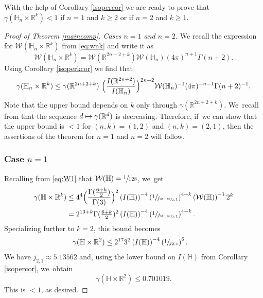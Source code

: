 \documentclass[11pt]{article}
\newcommand{\skpt}{\smallskip}
\newcommand\mto{\mathchoice{\longmapsto}{\mapsto}{\mapsto}{\mapsto}}
\let\oldsfrac\sfrac
\renewcommand{\sfrac}[2]{{\oldsfrac{#1}{#2}}}
\newcommand{\psfrac}[2]{{\sfrac{(#1)}{#2}}}
\theoremstyle{definition}
\newcommand{\1}{\mathbbm{1}}
\newcommand{\R}{\mathbb{R}}
\numberwithin{equation}{section}
\begin{document}
With the help of Corollary \ref{isopercor} we are ready to prove that $\gamma(\mathbb H_n\times\R^k)<1$ if $n=1$ and $k\geq 2$ or if $n=2$ and $k\geq 1$.

\skpt
\begin{proof}[Proof of Theorem \ref{maincomp}. Cases $n\!=\!1$ and $n\!=\!2$]
We recall the expression for $\mathcal W(\mathbb H_n\times\R^k)$ from \eqref{eq:wnk} and write it as
\[
\mathcal W(\mathbb H_n\times\R^k) = \mathcal W(\R^{2n+2+k}) \mathcal W(\mathbb H_n) (4\pi)^{n+1} \Gamma(n+2).
\]
Using Corollary \ref{isoperkcor} we find that
\begin{equation}
\label{eq:gammankbound}
\gamma(\mathbb H_n\times\R^k) \leq \gamma(\R^{2n+2+k})\ \Bigl(\frac{I(\R^{2n+2})}{I(\mathbb H_n)}\Bigr)^{2n+2} \mathcal W(\mathbb H_n)^{-1} (4\pi)^{-n-1} \Gamma(n+2)^{-1}.
\end{equation}
Note that the upper bound depends on $k$ only through $\gamma(\R^{2n+2+k})$. We~recall from \cite[Th.\,5.1]{HPS} that the sequence $d\mto \gamma(\R^d)$ is decreasing. Therefore, if~we can show that the upper bound is $<1$ for $(n,k)=(1,2)$ and $(n,k)=(2,1)$, then the assertions of the theorem for $n=1$ and $n=2$ will follow.

\subsubsection*{Case $n=1$} Recalling from \eqref{eq:W1} that $\mathcal W(\mathbb H) = \sfrac1{128}$, we~get
\begin{align}\label{eq:gammankboundn1}
\gamma(\mathbb H\times\R^k)
& \leq 4^4 \Bigl(\frac{\Gamma(\frac{6+k}{2})}{\Gamma(3)}\Bigr)^2
\left(I(\mathbb H)\right)^{-4} \left(\sfrac{1}{j_{\psfrac{2+k}{2},1}}\right)^{4+k}
\left(\mathcal W(\mathbb H)\right)^{-1} 2^k \notag \\
& = 2^{13+k} \Gamma(\tfrac{6+k}2)^2 \left(I(\mathbb H)\right)^{-4} \left(\sfrac{1}{j_{\psfrac{2+k}{2},1}}\right)^{4+k}.
\end{align}
Specializing further to $k=2$, this bound becomes
\begin{align*}
\gamma(\mathbb H\times\R^2)
& \leq 2^{17} 3^2 \left(I(\mathbb H)\right)^{-4} \left(\sfrac{1}{j_{2,1}}\right)^6.
\end{align*}
We have $j_{2,1}\approx 5.13562$ \cite[Table\,9.5]{AbSt} and, using the lower bound on $I(\mathbb H)$ from Corollary \ref{isopercor}, we~obtain
\[
\gamma(\mathbb H\times\R^2) \leq 0.701019.
\]
This is $<1$, as desired.


\end{proof}
\end{document}
